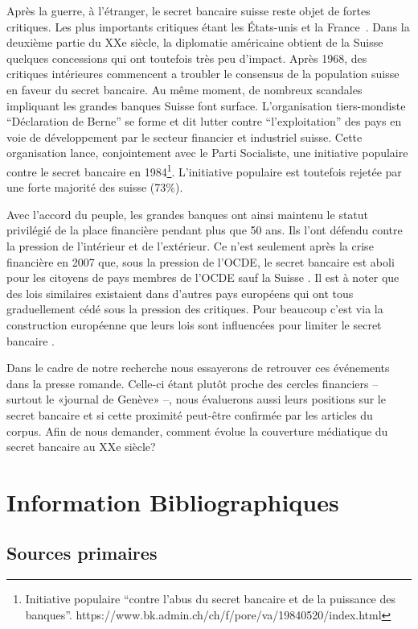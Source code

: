 \documentclass[11pt]{article}
\begin{document}
Après la guerre, à l'étranger, le secret bancaire suisse reste objet de fortes
critiques. Les plus importants critiques étant les États-unis et la
France~\citep[p. 503]{Mazbouri12}. Dans la deuxième partie du XXe siècle, la
diplomatie américaine obtient de la Suisse quelques concessions qui ont
toutefois très peu d'impact. Après 1968, des critiques intérieures commencent a
troubler le consensus de la population suisse en faveur du secret bancaire. Au
même moment, de nombreux scandales impliquant les grandes banques Suisse font
surface. L’organisation tiers-mondiste “Déclaration de Berne” \citep{EvB} se
forme et dit lutter contre ``l'exploitation'' des pays en voie de développement
par le secteur financier et industriel suisse. Cette organisation lance,
conjointement avec le Parti Socialiste, une initiative populaire contre le
secret bancaire en 1984\footnote{Initiative populaire ``contre l'abus du secret
bancaire et de la puissance des banques''.
https://www.bk.admin.ch/ch/f/pore/va/19840520/index.html}. L'initiative
populaire est toutefois rejetée par une forte majorité des suisse (73\%).

Avec l'accord du peuple, les grandes banques ont ainsi maintenu le
statut privilégié de la place financière pendant plus que 50 ans. Ils l’ont
défendu contre la pression de l’intérieur et de l’extérieur. Ce n’est
seulement après la crise financière en 2007 que, sous la pression de l'OCDE,
le secret bancaire est aboli pour les citoyens de pays membres de l'OCDE 
sauf la Suisse \citep{NeufVies}.
Il est à noter que des lois similaires existaient dans d'autres pays européens
qui ont tous graduellement cédé sous la pression des critiques. Pour beaucoup
c'est via la construction européenne que leurs lois sont influencées pour 
limiter le secret bancaire \citep[p. 32]{Palan09}. 

Dans le cadre de notre recherche nous essayerons de retrouver ces événements
dans la presse romande. Celle-ci étant plutôt proche des cercles financiers –
surtout le «journal de Genève» \citep{ConfClass1} –, nous évaluerons aussi
leurs positions sur le secret bancaire et si cette proximité peut-être
confirmée par les articles du corpus. Afin de nous demander, comment évolue la
couverture médiatique du secret bancaire au XXe siècle? 

\section{Information Bibliographiques}
\subsection{Sources primaires}
\end{document}
